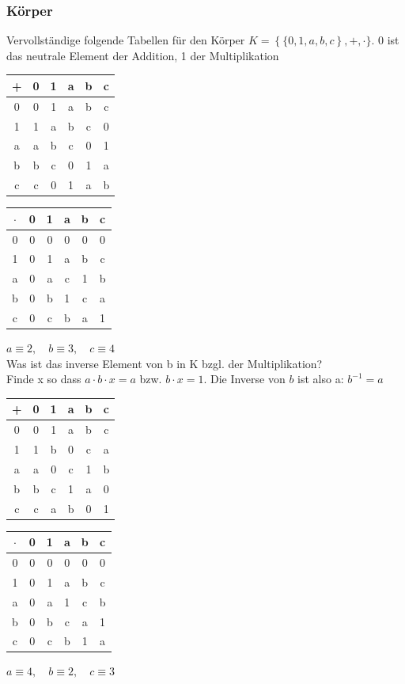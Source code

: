 \documentclass[11pt, a4paper]{article}
\begin{document}
\subsubsection{Körper}
Vervollständige folgende Tabellen für den Körper $K = \left\{\{0,1,a,b,c\right\}, +, \cdot\} $. 0 ist das neutrale Element der Addition, 1 der Multiplikation
\begin{center}
	\begin{tabular}{c|ccccc}
		+ & 0 & 1 & a & b & c \\ \hline
		0 & 0 & 1 & a & b & c \\
		1 & 1 & a & b & c & 0 \\
		a & a & b & c & 0 & 1 \\
		b & b & c & 0 & 1 & a \\
		c & c & 0 & 1 & a & b \\
	\end{tabular}
	\hspace{2cm}
	\begin{tabular}{c|ccccc}
		$\cdot$ & 0 & 1 & a & b & c \\ \hline
		0 & 0 & 0 & 0 & 0 & 0 \\
		1 & 0 & 1 & a & b & c \\
		a & 0 & a & c & 1 & b \\
		b & 0 & b & 1 & c & a \\
		c & 0 & c & b & a & 1 \\
	\end{tabular}
\end{center}
$a \equiv 2, \quad b \equiv 3, \quad c \equiv 4$ \\
Was ist das inverse Element von b in K bzgl. der Multiplikation? \\
Finde x so dass $a \cdot b \cdot x = a$ bzw. $b \cdot x = 1$. Die Inverse von $b$ ist also a: $b^{-1} = a$

\begin{center}
	\begin{tabular}{c|ccccc}
		+ & 0 & 1 & a & b & c \\ \hline
		0 & 0 & 1 & a & b & c \\
		1 & 1 & b & 0 & c & a \\
		a & a & 0 & c & 1 & b \\
		b & b & c & 1 & a & 0 \\
		c & c & a & b & 0 & 1 \\
	\end{tabular}
	\hspace{2cm}
	\begin{tabular}{c|ccccc}
		$\cdot$ & 0 & 1 & a & b & c \\ \hline
		0 & 0 & 0 & 0 & 0 & 0 \\
		1 & 0 & 1 & a & b & c \\
		a & 0 & a & 1 & c & b \\
		b & 0 & b & c & a & 1\\
		c & 0 & c & b & 1 & a \\
	\end{tabular}
\end{center}
$a \equiv 4, \quad b \equiv 2, \quad c \equiv 3$
\end{document}
